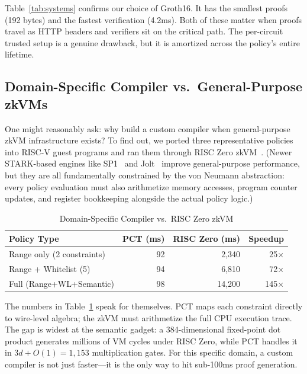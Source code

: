 \documentclass[10pt,conference]{IEEEtran}
\begin{document}
Table~\ref{tab:systems} confirms our choice of Groth16. It has the smallest proofs (192 bytes) and the fastest verification (4.2ms). Both of these matter when proofs travel as HTTP headers and verifiers sit on the critical path. The per-circuit trusted setup is a genuine drawback, but it is amortized across the policy's entire lifetime.

\subsection{Domain-Specific Compiler vs.\ General-Purpose zkVMs}
\label{sec:zkvm_comparison}

One might reasonably ask: why build a custom compiler when general-purpose zkVM infrastructure exists? To find out, we ported three representative policies into RISC-V guest programs and ran them through RISC Zero zkVM~\cite{risczero}. (Newer STARK-based engines like SP1~\cite{sp1} and Jolt~\cite{jolt} improve general-purpose performance, but they are all fundamentally constrained by the von Neumann abstraction: every policy evaluation must also arithmetize memory accesses, program counter updates, and register bookkeeping alongside the actual policy logic.)

\begin{table}[t]
\centering
\caption{Domain-Specific Compiler vs.\ RISC Zero zkVM}
\label{tab:zkvm}
\begin{tabular}{@{}lrrr@{}}
\toprule
\textbf{Policy Type} & \textbf{PCT (ms)} & \textbf{RISC Zero (ms)} & \textbf{Speedup} \\
\midrule
Range only (2 constraints) & 92 & 2,340 & 25$\times$ \\
Range + Whitelist (5) & 94 & 6,810 & 72$\times$ \\
Full (Range+WL+Semantic) & 98 & 14,200 & 145$\times$ \\
\bottomrule
\end{tabular}
\end{table}

The numbers in Table~\ref{tab:zkvm} speak for themselves. PCT maps each constraint directly to wire-level algebra; the zkVM must arithmetize the full CPU execution trace. The gap is widest at the semantic gadget: a 384-dimensional fixed-point dot product generates millions of VM cycles under RISC Zero, while PCT handles it in $3d + O(1) = 1{,}153$ multiplication gates. For this specific domain, a custom compiler is not just faster---it is the only way to hit sub-100ms proof generation.
\end{document}
